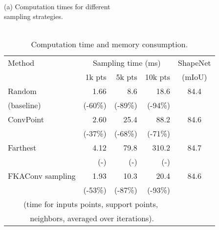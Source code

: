\begin{table}[t]
\caption{Computation time and memory consumption.}
\label{tab:timing_sampling}
\centering

\begin{minipage}{0.49\linewidth}
(a) Computation times for different\\
sampling strategies.
~\\~\\
{
\tiny
\begin{tabular}{l|r|r|r|c}
Method & \multicolumn{3}{c|}{Sampling time (ms)} & ShapeNet\\
       & 1k pts & 5k pts    &   10k pts & (mIoU)\\
\hline
Random     & 1.66 & 8.6 & 18.6 & 84.4\\
(baseline) & ({\color{ForestGreen}-60\%}) & ({\color{ForestGreen}-89\%}) &({\color{ForestGreen}-94\%}) \\
\hline
ConvPoint~\cite{boulch2020convpoint} & 2.60    & 25.4     & 88.2   & 84.6 \\
& ({\color{ForestGreen}-37\%}) & ({\color{ForestGreen}-68\%}) & ({\color{ForestGreen}-71\%}) \\
Farthest~\cite{qi2017pointnet++}        & 4.12    & 79.8    & 310.2   & 84.7\\
 &(-) &(-) &(-)\\
\hline
FKAConv sampling                            &  1.93   & 10.3   & 20.4 & 84.6\\
 &({\color{ForestGreen}-53\%}) & ({\color{ForestGreen}-87\%})   & ({\color{ForestGreen}-93\%})\\
\multicolumn{5}{l}{~~~~(time for  inputs points,  support points,}\\
\multicolumn{5}{l}{~~~~~ neighbors, averaged over  iterations).}
\end{tabular}
}

\end{minipage}
\hfill
\begin{minipage}{0.49\linewidth}


\end{minipage}
\end{table}
